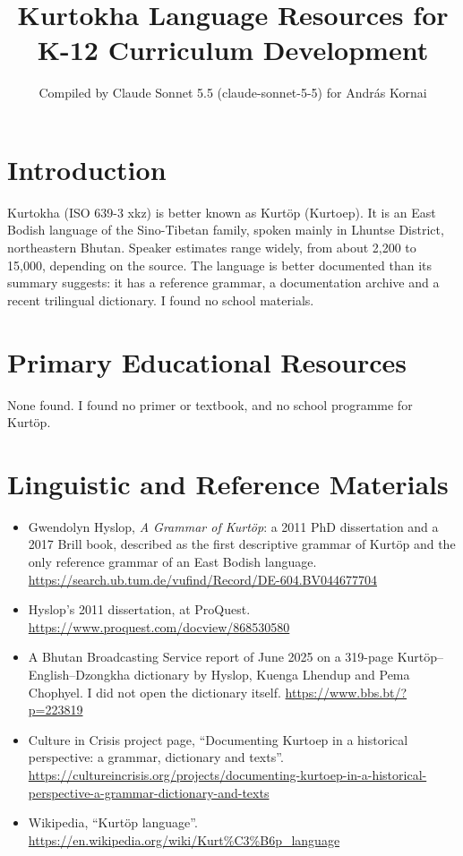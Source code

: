 \documentclass[12pt]{article}
\title{Kurtokha Language Resources for K-12 Curriculum Development}
\author{Compiled by Claude Sonnet 5.5 (claude-sonnet-5-5) for Andr\'as Kornai}
\date{}
\begin{document}
\maketitle

\section{Introduction}
Kurtokha (ISO 639-3 xkz) is better known as Kurt\"op (Kurtoep). It is an East Bodish language of the Sino-Tibetan family, spoken mainly in Lhuntse District, northeastern Bhutan. Speaker estimates range widely, from about 2,200 to 15,000, depending on the source. The language is better documented than its summary suggests: it has a reference grammar, a documentation archive and a recent trilingual dictionary. I found no school materials.

\section{Primary Educational Resources}
None found. I found no primer or textbook, and no school programme for Kurt\"op.

\section{Linguistic and Reference Materials}
\begin{itemize}
\item Gwendolyn Hyslop, \emph{A Grammar of Kurt\"op}: a 2011 PhD dissertation and a 2017 Brill book, described as the first descriptive grammar of Kurt\"op and the only reference grammar of an East Bodish language. \url{https://search.ub.tum.de/vufind/Record/DE-604.BV044677704}
\item Hyslop's 2011 dissertation, at ProQuest. \url{https://www.proquest.com/docview/868530580}
\item A Bhutan Broadcasting Service report of June 2025 on a 319-page Kurt\"op--English--Dzongkha dictionary by Hyslop, Kuenga Lhendup and Pema Chophyel. I did not open the dictionary itself. \url{https://www.bbs.bt/?p=223819}
\item Culture in Crisis project page, ``Documenting Kurtoep in a historical perspective: a grammar, dictionary and texts''. \url{https://cultureincrisis.org/projects/documenting-kurtoep-in-a-historical-perspective-a-grammar-dictionary-and-texts}
\item Wikipedia, ``Kurt\"op language''. \url{https://en.wikipedia.org/wiki/Kurt%C3%B6p_language}
\end{itemize}
\end{document}
